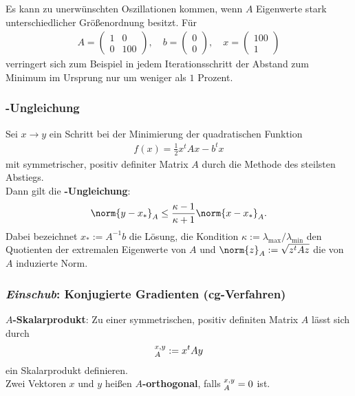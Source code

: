 Es kann zu unerwünschten Oszillationen kommen, wenn $A$ Eigenwerte stark
unterschiedlicher Größenordnung besitzt.
Für
\begin{align*}
    A = \begin{pmatrix}1 & 0\\0 & 100\end{pmatrix}, \quad
    b = \begin{pmatrix}0\\0\end{pmatrix}, \quad
    x = \begin{pmatrix}100\\1\end{pmatrix}
\end{align*}
verringert sich zum Beispiel in jedem Iterationsschritt der Abstand zum Minimum
im Ursprung nur um weniger als $1$ Prozent.

\subsubsection{%
    -Ungleichung%
}

Sei $x \rightarrow y$ ein Schritt bei der Minimierung der quadratischen
Funktion
\begin{align*}
    f(x) = \frac{1}{2} x^t A x - b^t x
\end{align*}
mit symmetrischer, positiv definiter Matrix $A$ durch die Methode des steilsten
Abstiegs. \\
Dann gilt die \textbf{-Ungleichung}:
\begin{align*}
    \norm{y - x_\ast}_A \le \frac{\kappa - 1}{\kappa + 1} \norm{x - x_\ast}_A.
\end{align*}
Dabei bezeichnet $x_\ast := A^{-1} b$ die Lösung, die Kondition
$\kappa := \lambda_{\max} / \lambda_{\min}$ den Quotienten der extremalen
Eigenwerte von $A$ und $\norm{z}_A := \sqrt{z^t A z}$ die von $A$ induzierte
Norm.

\subsubsection{%
    \emph{Einschub}: Konjugierte Gradienten (cg-Verfahren)%
}

\textbf{$A$-Skalarprodukt}:
Zu einer symmetrischen, positiv definiten Matrix $A$ lässt sich durch
\begin{align*}
    \sp{x, y}_A := x^t A y
\end{align*}
ein Skalarprodukt definieren. \\
Zwei Vektoren $x$ und $y$ heißen \textbf{$A$-orthogonal}, falls
$\sp{x, y}_A = 0$ ist.

